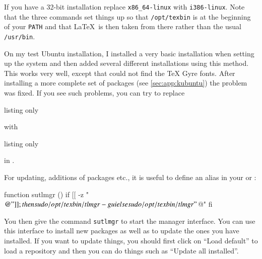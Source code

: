 If you have a 32-bit installation replace \texttt{x86\_64-linux} with \texttt{i386-linux}.
Note that the three commands set things up so
that \texttt{/opt/texbin} is at the beginning of your \texttt{PATH}
and that \LaTeX\ is then taken from there rather than the usual
\texttt{/usr/bin}.

On my test Ubuntu installation, 
I installed a very basic \TeXLive installation when setting up the system
and then added several different \TeXLive installations using this method.
This works very well, except that \XeLaTeX could not find the TeX Gyre fonts.
After installing a more complete set of packages (see \cref{sec:app:kubuntu})
the problem was fixed.
If you see such problems,
you can try to replace 
\begin{tcblisting}{listing only}
\setmainfont{TeX Gyre Termes}
\end{tcblisting}
\noindent with
\begin{tcblisting}{listing only}
\setmainfont{texgyretermes-regular.otf}
\end{tcblisting}
\noindent in .


For updating, additions of packages etc., it is useful to define an
alias in your  or :
\begin{bashlisting}
function sutlmgr () {
    if [[ -z "$@" ]]; then
      sudo /opt/texbin/tlmgr -gui
    else
      sudo /opt/texbin/tlmgr "$@"
    fi
}
\end{bashlisting}
You then give the command \texttt{sutlmgr} to start the \TeXLive
manager interface. You can use this interface to install new packages
as well as to update the ones you have installed.
If you want to update things, you should first click on \enquote{Load default} to
load a repository and then you can do things such as
\enquote{Update all installed}.



